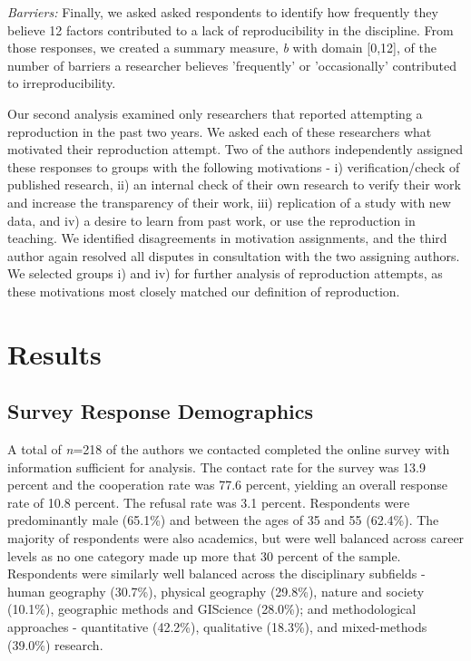 \documentclass[]{interact}
\theoremstyle{plain}%
\theoremstyle{definition}
\theoremstyle{remark}
\begin{document}
\textit{Barriers:} Finally, we asked asked respondents to identify how frequently they believe 12 factors contributed to a lack of reproducibility in the discipline. 
From those responses, we created a summary measure, \textit{b} with domain [0,12], of the number of barriers a researcher believes 'frequently' or 'occasionally' contributed to irreproducibility. 

Our second analysis examined only researchers that reported attempting a reproduction in the past two years. 
We asked each of these researchers what motivated their reproduction attempt. 
Two of the authors independently assigned these responses to groups with the following motivations - i) verification/check of published research, ii) an internal check of their own research to verify their work and increase the transparency of their work, iii) replication of a study with new data, and iv) a desire to learn from past work, or use the reproduction in teaching. 
We identified disagreements in motivation assignments, and the third author again resolved all disputes in consultation with the two assigning authors.
We selected groups i) and iv) for further analysis of reproduction attempts, as these motivations most closely matched our definition of reproduction. 


\section*{Results}

\subsection*{Survey Response Demographics}
A total of \textit{n}=218 of the authors we contacted completed the online survey with information sufficient for analysis. 
The contact rate for the survey was 13.9 percent and the cooperation rate was 77.6 percent, yielding an overall response rate of 10.8 percent. 
The refusal rate was 3.1 percent.
Respondents were predominantly male (65.1\%) and between the ages of 35 and 55 (62.4\%). 
The majority of respondents were also academics, but were well balanced across career levels as no one category made up more that 30 percent of the sample.
Respondents were similarly well balanced across the disciplinary subfields - human geography (30.7\%), physical geography (29.8\%), nature and society (10.1\%), geographic methods and GIScience (28.0\%); and methodological approaches - quantitative (42.2\%), qualitative (18.3\%), and mixed-methods (39.0\%) research.
\end{document}
